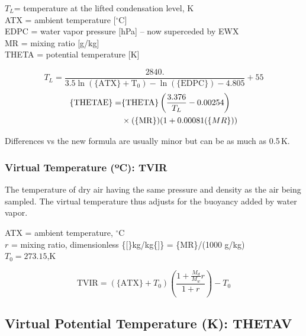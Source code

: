\documentclass[
  english,
]{book}
\begin{document}
\(T_{L}\)= temperature at the lifted condensation level, K\\
ATX = ambient temperature {[}\(^{\circ}\mathrm{C}\){]}\\
EDPC = water vapor pressure {[}hPa{]} -- now superceded by EWX\\
MR = mixing ratio {[}g/kg{]}\\
THETA = potential temperature {[}K{]}

\begin{equation}
T_{L}=\frac{2840.}{3.5\ln(\mathrm{\{ATX\}+T_{0}})-\ln(\mathrm{\{EDPC\}})-4.805}+55
\label{eq:TLCL2}
\end{equation}
\begin{align}
\mathrm{\{THETAE\}} = & \mathrm{\{THETA\}}\left(\frac{3.376}{T_{L}}-0.00254\right)\notag \\
& \times (\mathrm{\{MR\}})(1+0.00081(\{MR\}))
\label{eq:THETAE}
\end{align}

Differences vs the new formula are usually minor but can be as much as 0.5 K.

\hypertarget{TVIR}{%
\subsubsection*{\texorpdfstring{Virtual Temperature ({º}C): TVIR}{Virtual Temperature (ºC): TVIR}}\label{TVIR}}

The temperature of dry air having the same pressure and density as the air being sampled. The virtual temperature thus adjusts for the buoyancy added by water vapor.

ATX = ambient temperature, \(^{\circ}\mathrm{C}\)\\
\(r\) = mixing ratio, dimensionless \{{[}\}kg/kg\{{]}\} = \{MR\}/(1000 g/kg)\\
\(T_{0}=273.15\),K

\begin{equation}
\mathrm{TVIR}=(\mathrm{\{ATX\}}+T_{0})\left(\frac{1+\frac{M_{d}}{M_{w}}r}{1+r}\right)-T_{0}
\label{eq:TVIR}
\end{equation}

\hypertarget{thetav}{%
\subsection*{Virtual Potential Temperature (K): THETAV}\label{thetav}}
\end{document}
